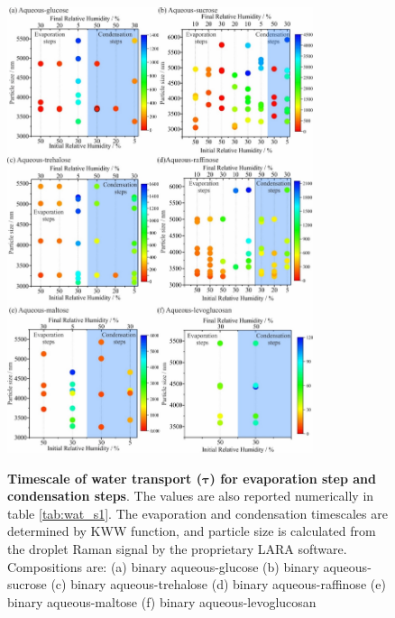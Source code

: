 \begin{figure}
    \centering
    \caption{\textbf{Timescale of water transport ($\bm{\tau}$) for evaporation step and condensation steps}. The values are also reported numerically in table \ref{tab:wat_s1}. The evaporation and condensation timescales are determined by KWW function, and particle size is calculated from the droplet Raman signal by the proprietary LARA software. Compositions are: (a) binary aqueous-glucose (b) binary aqueous-sucrose (c) binary aqueous-trehalose (d) binary aqueous-raffinose (e) binary aqueous-maltose (f) binary aqueous-levoglucosan}
    \includegraphics[width=0.8\textwidth]{chapters/water_hopping/figures/image005.jpg}
    \label{fig:wat_s3}
\end{figure}

